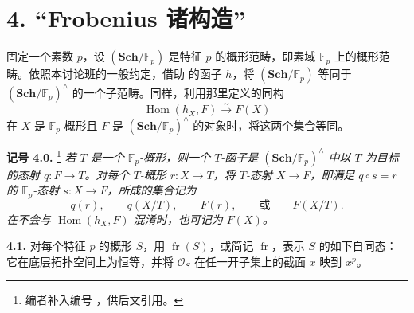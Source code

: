 
\section*{4. “Frobenius 诸构造”}
\label{sga3:VIIA:4}

固定一个素数 \(p\)，设 \((\mathbf{Sch}/\mathbb F_p)\) 是特征 \(p\) 的概形范畴，即素域 \(\mathbb F_p\) 上的概形范畴。依照本讨论班的一般约定，借助 的函子 \(h\)，将 \((\mathbf{Sch}/\mathbb F_p)\) 等同于 \((\mathbf{Sch}/\mathbb F_p)^\wedge\) 的一个子范畴。同样，利用那里定义的同构
\[
  \operatorname{Hom}(h_X,F)\xrightarrow{\sim}F(X)
\]
在 \(X\) 是 \(\mathbb F_p\)-概形且 \(F\) 是 \((\mathbf{Sch}/\mathbb F_p)^\wedge\) 的对象时，将这两个集合等同。

\medskip
\noindent\textbf{记号 4.0.}
\label{sga3:VIIA:4.0}
\footnote{编者补入编号 ，供后文引用。}
\textit{若 \(T\) 是一个 \(\mathbb F_p\)-概形，则一个 \(T\)-函子是 \((\mathbf{Sch}/\mathbb F_p)^\wedge\) 中以 \(T\) 为目标的态射 \(q:F\to T\)。对每个 \(T\)-概形 \(r:X\to T\)，将 \(T\)-态射 \(X\to F\)，即满足 \(q\circ s=r\) 的 \(\mathbb F_p\)-态射 \(s:X\to F\)，所成的集合记为}
\[
  q(r),\qquad q(X/T),\qquad F(r),\qquad\text{或}\qquad F(X/T).
\]
\textit{在不会与 \(\operatorname{Hom}(h_X,F)\) 混淆时，也可记为 \(F(X)\)。}

\medskip
\noindent\textbf{4.1.}
\label{sga3:VIIA:4.1}
对每个特征 \(p\) 的概形 \(S\)，用 \(\operatorname{fr}(S)\)，或简记 \(\operatorname{fr}\)，表示 \(S\) 的如下自同态：它在底层拓扑空间上为恒等，并将 \(\mathcal O_S\) 在任一开子集上的截面 \(x\) 映到 \(x^p\)。

